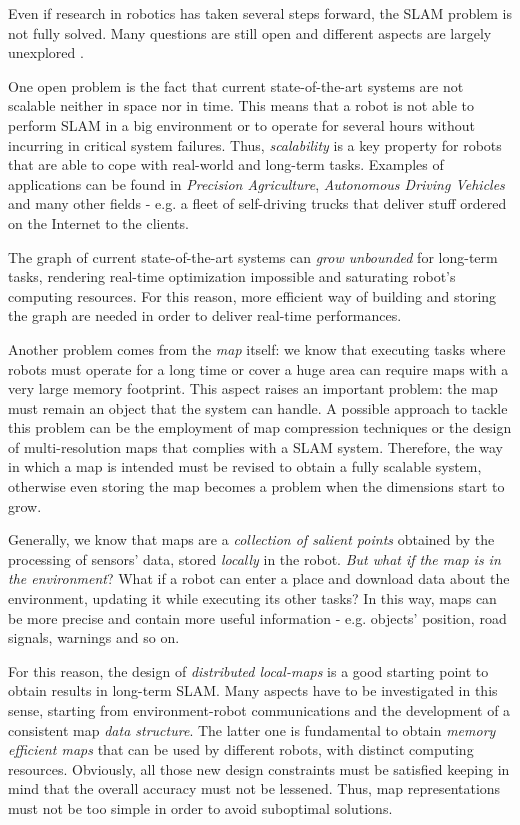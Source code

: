 \documentclass[10pt,a4paper, notitlepage]{report}
\begin{document}
Even if research in robotics has taken several steps forward, the SLAM problem is not fully solved. Many questions are still open and different aspects are largely unexplored \cite{carlone2016slam-survey}. 

One open problem is the fact that current state-of-the-art systems are not scalable neither in space nor in time. This means that a robot is not able to perform SLAM in a big environment or to operate for several hours without incurring in critical system failures. Thus, \textit{scalability} is a key property for robots that are able to cope with real-world and long-term tasks. Examples of applications can be found in \textit{Precision Agriculture}, \textit{Autonomous Driving Vehicles} and many other fields - e.g. a fleet of self-driving trucks that deliver stuff ordered on the Internet to the clients. 

The graph of current state-of-the-art systems can \textit{grow unbounded} for long-term tasks, rendering real-time optimization impossible and saturating robot's computing resources. For this reason, more efficient way of building and storing the graph are needed in order to deliver real-time performances.

Another problem comes from the \textit{map} itself: we know that executing tasks where robots must operate for a long time or cover a huge area can require maps with a very large memory footprint. This aspect raises an important problem: the map must remain an object that the system can handle. A possible approach to tackle this problem can be the employment of map compression techniques or the design of multi-resolution maps that complies with a SLAM system. Therefore, the way in which a map is intended must be revised to obtain a fully scalable system, otherwise even storing the map becomes a problem when the dimensions start to grow. 

Generally, we know that maps are a \textit{collection of salient points} obtained by the processing of sensors' data, stored \textit{locally} in the robot. \textit{But what if the map is in the environment}? What if a robot can enter a place and download data about the environment, updating it while executing its other tasks? In this way, maps can be more precise and contain more useful information - e.g. objects' position, road signals, warnings and so on. 

For this reason, the design of \textit{distributed local-maps} is a good starting point to obtain results in long-term SLAM. Many aspects have to be investigated in this sense, starting from environment-robot communications and the development of a consistent map \textit{data structure}. The latter one is fundamental to obtain \textit{memory efficient maps} that can be used by different robots, with distinct computing resources. Obviously, all those new design constraints must be satisfied keeping in mind that the overall accuracy must not be lessened. Thus, map representations must not be too simple in order to avoid suboptimal solutions.
\end{document}
